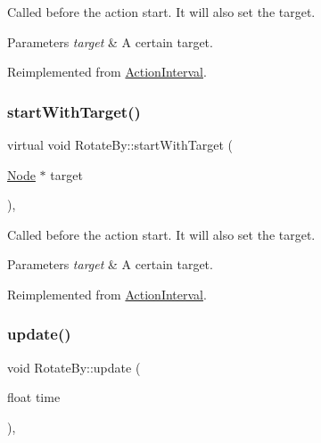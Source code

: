 Called before the action start. It will also set the target.


\begin{DoxyParams}{Parameters}
{\em target} & A certain target. \\
\hline
\end{DoxyParams}


Reimplemented from \hyperlink{classActionInterval_ad3d91186b2c3108488ddbbdbbd982484}{Action\+Interval}.

\mbox{\label{classRotateBy_a3b0eb97d069ef935dd7546328522a31d}} 
\subsubsection{\texorpdfstring{start\+With\+Target()}{startWithTarget()}\hspace{0.1cm}{\footnotesize\ttfamily [2/2]}}
{\footnotesize\ttfamily virtual void Rotate\+By\+::start\+With\+Target (\begin{DoxyParamCaption}\item[{\hyperlink{classNode}{Node} $\ast$}]{target }\end{DoxyParamCaption})\hspace{0.3cm}{\ttfamily [override]}, {\ttfamily [virtual]}}

Called before the action start. It will also set the target.


\begin{DoxyParams}{Parameters}
{\em target} & A certain target. \\
\hline
\end{DoxyParams}


Reimplemented from \hyperlink{classActionInterval_ad3d91186b2c3108488ddbbdbbd982484}{Action\+Interval}.

\mbox{\label{classRotateBy_ab893a1ea5e91e7d506c63d08322ce218}} 
\subsubsection{\texorpdfstring{update()}{update()}\hspace{0.1cm}{\footnotesize\ttfamily [1/2]}}
{\footnotesize\ttfamily void Rotate\+By\+::update (\begin{DoxyParamCaption}\item[{float}]{time }\end{DoxyParamCaption})\hspace{0.3cm}{\ttfamily [override]}, {\ttfamily [virtual]}}


